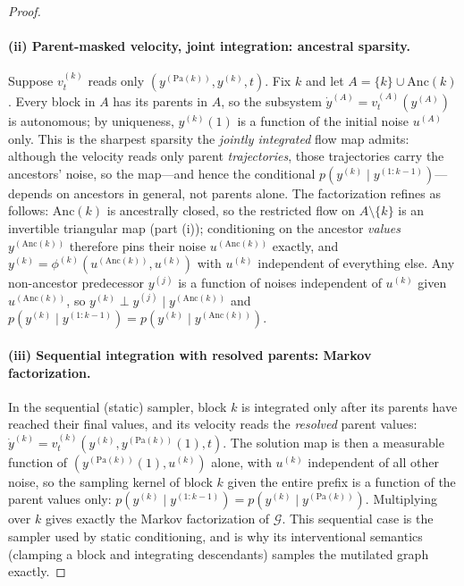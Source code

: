 \begin{proof}
{\paragraph{(ii) Parent-masked velocity, joint integration: ancestral sparsity.}
Suppose $v_t^{(k)}$ reads only $(y^{(\mathrm{Pa}(k))}, y^{(k)}, t)$. Fix $k$ and let $A = \{k\} \cup \mathrm{Anc}(k)$. Every block in $A$ has its parents in $A$, so the subsystem $\dot{y}^{(A)} = v_t^{(A)}(y^{(A)})$ is autonomous; by uniqueness, $y^{(k)}(1)$ is a function of the initial noise $u^{(A)}$ only. This is the sharpest sparsity the \emph{jointly integrated} flow map admits: although the velocity reads only parent \emph{trajectories}, those trajectories carry the ancestors' noise, so the map---and hence the conditional $p(y^{(k)} \mid y^{(1:k-1)})$---depends on ancestors in general, not parents alone. The factorization refines as follows: $\mathrm{Anc}(k)$ is ancestrally closed, so the restricted flow on $A \setminus \{k\}$ is an invertible triangular map (part (i)); conditioning on the ancestor \emph{values} $y^{(\mathrm{Anc}(k))}$ therefore pins their noise $u^{(\mathrm{Anc}(k))}$ exactly, and $y^{(k)} = \phi^{(k)}(u^{(\mathrm{Anc}(k))}, u^{(k)})$ with $u^{(k)}$ independent of everything else. Any non-ancestor predecessor $y^{(j)}$ is a function of noises independent of $u^{(k)}$ given $u^{(\mathrm{Anc}(k))}$, so $y^{(k)} \perp y^{(j)} \mid y^{(\mathrm{Anc}(k))}$ and $p(y^{(k)} \mid y^{(1:k-1)}) = p(y^{(k)} \mid y^{(\mathrm{Anc}(k))})$.

\paragraph{(iii) Sequential integration with resolved parents: Markov factorization.}
In the sequential (static) sampler, block $k$ is integrated only after its parents have reached their final values, and its velocity reads the \emph{resolved} parent values: $\dot{y}^{(k)} = v_t^{(k)}(y^{(k)}, y^{(\mathrm{Pa}(k))}(1), t)$. The solution map is then a measurable function of $(y^{(\mathrm{Pa}(k))}(1), u^{(k)})$ alone, with $u^{(k)}$ independent of all other noise, so the sampling kernel of block $k$ given the entire prefix is a function of the parent values only: $p(y^{(k)} \mid y^{(1:k-1)}) = p(y^{(k)} \mid y^{(\mathrm{Pa}(k))})$. Multiplying over $k$ gives exactly the Markov factorization of $\mathcal{G}$. This sequential case is the sampler used by static conditioning, and is why its interventional semantics (clamping a block and integrating descendants) samples the mutilated graph exactly.}
\end{proof}

